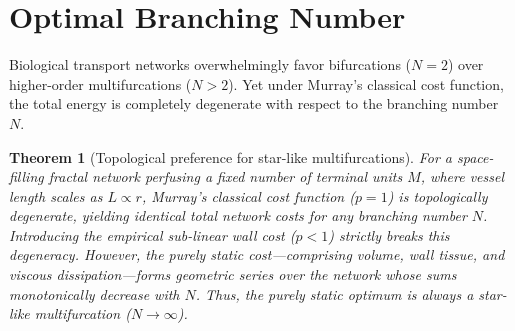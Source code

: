 \documentclass[11pt,a4paper]{article}
\newtheorem{theorem}{Theorem}
\theoremstyle{remark}
\begin{document}
\section{Optimal Branching Number}
\label{sec:branching_number}

Biological transport networks overwhelmingly favor bifurcations ($N=2$) over
higher-order multifurcations ($N>2$). Yet under Murray's classical cost
function, the total energy is completely degenerate with respect to the
branching number $N$. 

\begin{theorem}[Topological preference for star-like multifurcations]
\label{thm:Nstar}
For a space-filling fractal network perfusing a fixed number of terminal units $M$,
where vessel length scales as $L \propto r$, Murray's classical cost function ($p=1$)
is topologically degenerate, yielding identical total network costs for any branching
number $N$. Introducing the empirical sub-linear wall cost ($p<1$) strictly breaks
this degeneracy. However, the purely static cost---comprising volume, wall tissue,
and viscous dissipation---forms geometric series over the network whose sums
monotonically decrease with $N$. Thus, the purely static optimum is always a star-like
multifurcation ($N \to \infty$).
\end{theorem}
\end{document}
